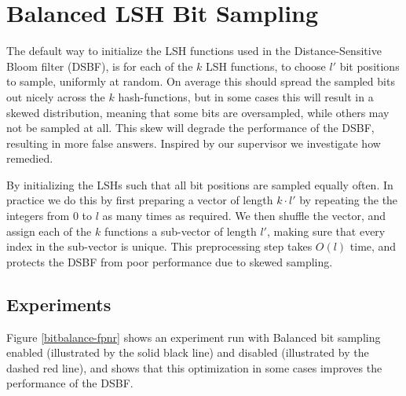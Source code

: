 \documentclass[a4paper,11pt]{article}
\begin{document}
\section{Balanced LSH Bit Sampling} \label{sec:balanced}

The default way to initialize the LSH functions used in the Distance-Sensitive Bloom filter (DSBF), is for each of the $k$ LSH functions, to choose $l'$ bit positions to sample, uniformly at random. On average this should spread the sampled bits out nicely across the $k$ hash-functions, but in some cases this will result in a skewed distribution, meaning that some bits are oversampled, while others may not be sampled at all. This skew will degrade the performance of the DSBF, resulting in more false answers.
Inspired by our supervisor we investigate how remedied.

By initializing the LSHs such that all bit positions are sampled equally often.
In practice we do this by first preparing a vector of length $k \cdot l'$ by repeating the the integers from 0 to $l$ as many times as required. We then shuffle the vector, and assign each of the $k$ functions a sub-vector of length $l'$, making sure that every index in the sub-vector is unique. This preprocessing step takes $O(l)$ time, and protects the DSBF from poor performance due to skewed sampling.


\subsection{Experiments}
Figure \ref{bitbalance-fpnr} shows an experiment run with Balanced bit sampling enabled (illustrated by the solid black line) and disabled (illustrated by the dashed red line), and shows that this optimization in some cases improves the performance of the DSBF.
\end{document}
